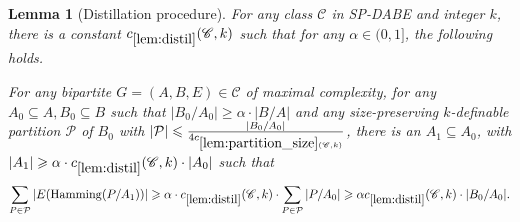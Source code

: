 \documentclass[11pt]{article}
\newtheorem{lemma}[theorem]{Lemma}
\theoremstyle{definition}
\newcommand{\CC}{{\mathscr C}}
\newcommand{\inducedSS}[2]{#1/#2}%
\renewcommand{\geq}{\geqslant}
\renewcommand{\ge}{\geqslant}
\newcommand{\Pp}{\mathcal{P}}
\newcommand{\hamming}{\mathrm{Hamming}}
\begin{document}
\begin{lemma}[Distillation procedure]\label{lem:distil}
For any class $\CC$ in SP-DABE and integer $k$, there is a constant
$c_{\ref{lem:distil}}(\CC, k)$ such that for any $\alpha \in (0, 1]$, the following holds.

For any bipartite $G = (A, B, E) \in \CC$ of maximal complexity,
for any $A_0 \subseteq A, B_0 \subseteq B$ such that $|\inducedSS{B_0}{A_0}| \geqslant \alpha \cdot |\inducedSS{B}{A}|$
and any size-preserving $k$-definable partition $\Pp$ of $B_0$ with $|\Pp| \leqslant \frac{|\inducedSS{B_0}{A_0}|}{4 c_{\ref{lem:partition_size}(\CC, k)}}$,
there is an $A_1 \subseteq A_0$, with $|A_1| \geq \alpha \cdot c_{\ref{lem:distil}}(\CC, k) \cdot |A_0|$ such that  
\[
\sum_{P \in \Pp} |E(\hamming(\inducedSS{P}{A_1}))| \ge
\alpha \cdot c_{\ref{lem:distil}}(\CC, k) \cdot \sum_{P \in \Pp} |\inducedSS{P}{A_0}| \ge \alpha c_{\ref{lem:distil}}(\CC, k) \cdot |B_0/A_0|.
\]
\end{lemma}
\end{document}
